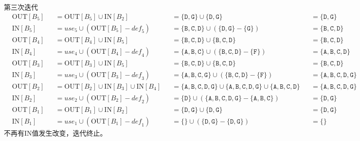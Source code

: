 \documentclass{article}
\begin{document}
第三次迭代
\begin{align*}
    & \text{OUT}[B_5] &&= \text{OUT}[B_5] \cup \text{IN}[B_2]    &&= \{\texttt{D},\texttt{G}\} \cup \{\texttt{D},\texttt{G}\} &&= \{\texttt{D},\texttt{G}\} \\
    & \text{IN}[B_5]  &&= \textit{use}_5 \cup ( \text{OUT}[B_5] - \textit{def}_5 ) &&= \{\texttt{B},\texttt{C},\texttt{D}\} \cup ( \{\texttt{D},\texttt{G}\} - \{\texttt{G}\} ) &&= \{\texttt{B},\texttt{C},\texttt{D}\} \\
    & \text{OUT}[B_4] &&= \text{OUT}[B_4] \cup \text{IN}[B_5]    &&= \{\texttt{B},\texttt{C},\texttt{D}\} \cup \{\texttt{B},\texttt{C},\texttt{D}\} &&= \{\texttt{B},\texttt{C},\texttt{D}\} \\
    & \text{IN}[B_4]  &&= \textit{use}_4 \cup ( \text{OUT}[B_4] - \textit{def}_4 ) &&= \{\texttt{A},\texttt{B},\texttt{C}\} \cup ( \{\texttt{B},\texttt{C},\texttt{D}\} - \{\texttt{F}\} ) &&= \{\texttt{A},\texttt{B},\texttt{C},\texttt{D}\} \\
    & \text{OUT}[B_3] &&= \text{OUT}[B_3] \cup \text{IN}[B_5]    &&= \{\texttt{B},\texttt{C},\texttt{D}\} \cup \{\texttt{B},\texttt{C},\texttt{D}\} &&= \{\texttt{B},\texttt{C},\texttt{D}\} \\
    & \text{IN}[B_3]  &&= \textit{use}_3 \cup ( \text{OUT}[B_3] - \textit{def}_3 ) &&= \{\texttt{A},\texttt{B},\texttt{C},\texttt{G}\} \cup ( \{\texttt{B},\texttt{C},\texttt{D}\} - \{\texttt{F}\} ) &&= \{\texttt{A},\texttt{B},\texttt{C},\texttt{D},\texttt{G}\} \\
    & \text{OUT}[B_2] &&= \text{OUT}[B_2] \cup \text{IN}[B_3] \cup \text{IN}[B_4]    &&= \{\texttt{A},\texttt{B},\texttt{C},\texttt{D},\texttt{G}\} \cup \{\texttt{A},\texttt{B},\texttt{C},\texttt{D},\texttt{G}\} \cup \{\texttt{A},\texttt{B},\texttt{C},\texttt{D}\} &&= \{\texttt{A},\texttt{B},\texttt{C},\texttt{D},\texttt{G}\} \\
    & \text{IN}[B_2]  &&= \textit{use}_2 \cup ( \text{OUT}[B_2] - \textit{def}_2 ) &&= \{\texttt{D}\} \cup ( \{\texttt{A},\texttt{B},\texttt{C},\texttt{D},\texttt{G}\} - \{\texttt{A},\texttt{B},\texttt{C}\} ) &&= \{\texttt{D},\texttt{G}\} \\
    & \text{OUT}[B_1] &&= \text{OUT}[B_1] \cup \text{IN}[B_2]    &&= \{\texttt{D},\texttt{G}\} \cup \{\texttt{D},\texttt{G}\} &&= \{\texttt{D},\texttt{G}\} \\
    & \text{IN}[B_1]  &&= \textit{use}_1 \cup ( \text{OUT}[B_1] - \textit{def}_1 ) &&= \{  \} \cup ( \{\texttt{D},\texttt{G}\} - \{\texttt{D},\texttt{G}\} ) &&= \{  \}
\end{align*}
不再有IN值发生改变，迭代终止。
\end{document}

